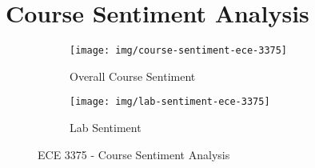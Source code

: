 \chapter{Course Sentiment Analysis}


\begin{figure}
    \centering
    \begin{subfigure}{.8\linewidth}
        \centering
        \texttt{[image: img/course-sentiment-ece-3375]}
        \caption{Overall Course Sentiment}
        \label{fig:ece-3375-course-sentiment}
    \end{subfigure}
    
    \begin{subfigure}{.8\linewidth}
        \centering
        \texttt{[image: img/lab-sentiment-ece-3375]}
        \caption{Lab Sentiment}
        \label{fig:ece-3375-lab-sentiment}
    \end{subfigure}
    
    \caption{ECE 3375 - Course Sentiment Analysis\cite{evals:ece3375-2013, evals:ece3375-2014}}
\end{figure}